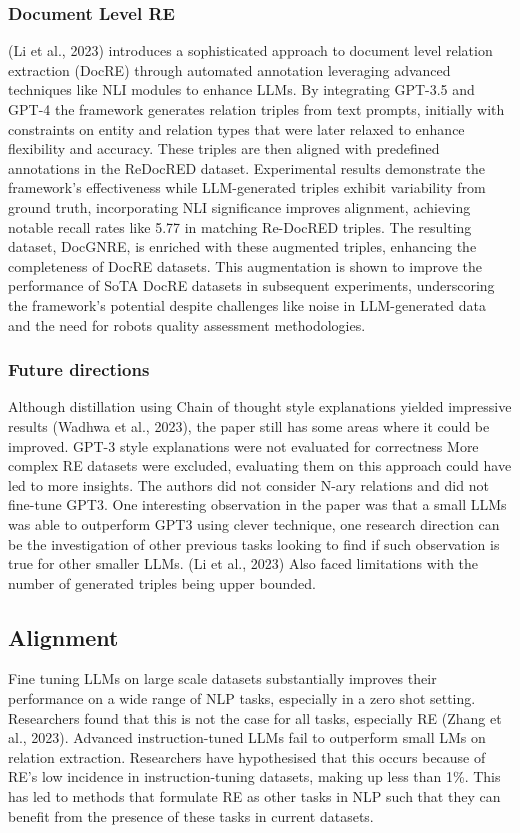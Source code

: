 \documentclass[twocolumn, 11pt]{extarticle}
\begin{document}
\subsubsection{Document Level RE}
(Li et al., 2023) introduces a sophisticated approach to document level relation extraction (DocRE) through automated annotation leveraging advanced techniques like NLI modules to enhance LLMs. By integrating GPT-3.5 and GPT-4 the framework generates relation triples from text prompts, initially with constraints on entity and relation types that were later relaxed to enhance flexibility and accuracy. These triples are then aligned with predefined annotations in the ReDocRED dataset. Experimental results demonstrate the framework’s effectiveness while LLM-generated triples exhibit variability from ground truth, incorporating NLI significance improves alignment, achieving notable recall rates like 5.77 in matching Re-DocRED triples. The resulting dataset, DocGNRE, is enriched with these augmented triples, enhancing the completeness of DocRE datasets. This augmentation is shown to improve the performance of SoTA DocRE datasets in subsequent experiments, underscoring the framework’s potential despite challenges like noise in LLM-generated data and the need for robots quality assessment methodologies. 

\subsubsection{Future directions}
Although distillation using Chain of thought style explanations yielded impressive results (Wadhwa et al., 2023), the paper still has some areas where it could be improved. GPT-3 style explanations were not evaluated for correctness More complex RE datasets were excluded, evaluating them on this approach could have led to more insights. The authors did not consider N-ary relations and did not fine-tune GPT3. One interesting observation in the paper was that a small LLMs was able to outperform GPT3 using clever technique, one research direction can be the investigation of other previous tasks looking to find if such observation is true for other smaller LLMs. (Li et al., 2023) Also faced limitations with the number of generated triples being upper bounded.

\subsection{Alignment}
Fine tuning LLMs on large scale datasets substantially improves their performance on a wide range of NLP tasks, especially in a zero shot setting. Researchers found that this is not the case for all tasks, especially RE (Zhang et al., 2023).  Advanced instruction-tuned LLMs fail to outperform small LMs on relation extraction. Researchers have hypothesised that this occurs because of RE’s low incidence in instruction-tuning datasets, making up less than 1\%. This has led to methods that formulate RE as other tasks in NLP such that they can benefit from the presence of these tasks in current datasets. 
\end{document}
